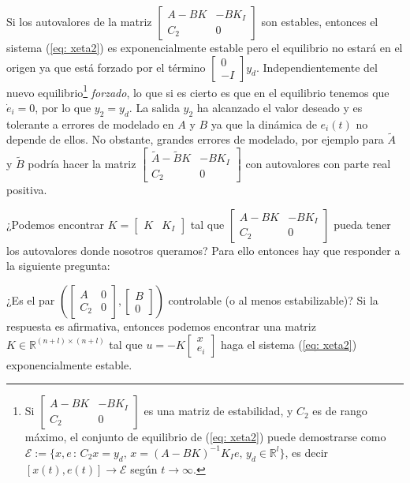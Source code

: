 Si los autovalores de la matriz $\begin{bmatrix}A-BK & -BK_I \\ C_2 & 0\end{bmatrix}$ son estables, entonces el sistema (\ref{eq: xeta2}) es exponencialmente estable pero el equilibrio no estará en el origen ya que está forzado por el término $\begin{bmatrix}0 \\ -I\end{bmatrix} y_d$. Independientemente del nuevo equilibrio\footnote{Si $\begin{bmatrix}A-BK & -BK_I \\ C_2 & 0\end{bmatrix}$ es una matriz de estabilidad, y $C_2$ es de rango máximo, el conjunto de equilibrio de (\ref{eq: xeta2}) puede demostrarse como $\mathcal{E} := \{x, e \, : \, C_2x = y_d, \, x = (A-BK)^{-1}K_Ie, \, y_d\in\mathbb{R}^l\}$, es decir $[x(t),e(t)] \to \mathcal{E}$ según $t\to\infty$.
	} \emph{forzado}, lo que si es cierto es que en el equilibrio tenemos que $\dot e_i = 0$, por lo que $y_2 = y_d$. La salida $y_2$ ha alcanzado el valor deseado y es tolerante a errores de modelado en $A$ y $B$ ya que la dinámica de $e_i(t)$ no depende de ellos. No obstante, grandes errores de modelado, por ejemplo para $\tilde A$ y $\tilde B$ podría hacer la matriz $\begin{bmatrix}\tilde A-\tilde BK & -BK_I \\ C_2 & 0\end{bmatrix}$ con autovalores con parte real positiva.

¿Podemos encontrar $K = \begin{bmatrix}K & K_I\end{bmatrix}$ tal que $\begin{bmatrix}A-BK & -BK_I \\ C_2 & 0\end{bmatrix}$ pueda tener los autovalores donde nosotros queramos? Para ello entonces hay que responder a la siguiente pregunta:

¿Es el par $\left(\begin{bmatrix}A & 0 \\ C_2 & 0\end{bmatrix}, \begin{bmatrix}B \\ 0 \end{bmatrix}\right)$ controlable (o al menos estabilizable)? Si la respuesta es afirmativa, entonces podemos encontrar una matriz $K\in\mathbb{R}^{(n+l)\times(n+l)}$ tal que $u = -K \begin{bmatrix}x \\ e_i \end{bmatrix}$ haga el sistema (\ref{eq: xeta2}) exponencialmente estable.

